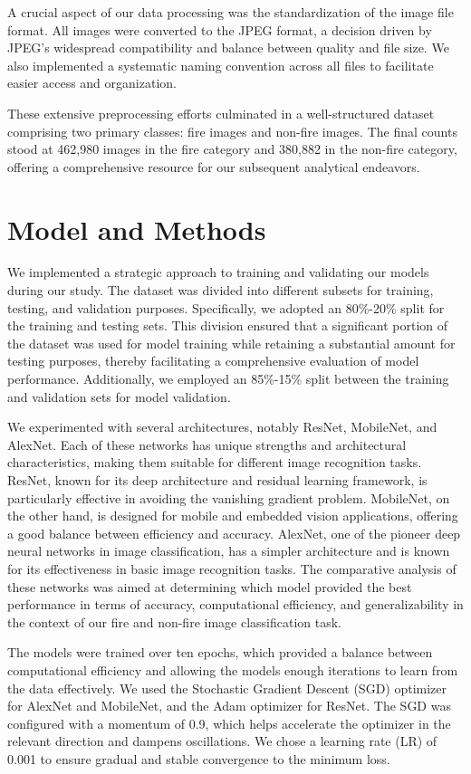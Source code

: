 A crucial aspect of our data processing was the standardization of the image file format. All images were converted to the JPEG format, a decision driven by JPEG's widespread compatibility and balance between quality and file size. We also implemented a systematic naming convention across all files to facilitate easier access and organization.

These extensive preprocessing efforts culminated in a well-structured dataset comprising two primary classes: fire images and non-fire images. The final counts stood at 462,980 images in the fire category and 380,882 in the non-fire category, offering a comprehensive resource for our subsequent analytical endeavors.

\section{Model and Methods}

We implemented a strategic approach to training and validating our models during our study. The dataset was divided into different subsets for training, testing, and validation purposes. Specifically, we adopted an 80\%-20\% split for the training and testing sets. This division ensured that a significant portion of the dataset was used for model training while retaining a substantial amount for testing purposes, thereby facilitating a comprehensive evaluation of model performance. Additionally, we employed an 85\%-15\% split between the training and validation sets for model validation.

We experimented with several architectures, notably ResNet, MobileNet, and AlexNet. Each of these networks has unique strengths and architectural characteristics, making them suitable for different image recognition tasks. ResNet, known for its deep architecture and residual learning framework, is particularly effective in avoiding the vanishing gradient problem. MobileNet, on the other hand, is designed for mobile and embedded vision applications, offering a good balance between efficiency and accuracy. AlexNet, one of the pioneer deep neural networks in image classification, has a simpler architecture and is known for its effectiveness in basic image recognition tasks. The comparative analysis of these networks was aimed at determining which model provided the best performance in terms of accuracy, computational efficiency, and generalizability in the context of our fire and non-fire image classification task.

The models were trained over ten epochs, which provided a balance between computational efficiency and allowing the models enough iterations to learn from the data effectively. We used the Stochastic Gradient Descent (SGD) optimizer for AlexNet and MobileNet, and the Adam optimizer for ResNet. The SGD was configured with a momentum of 0.9, which helps accelerate the optimizer in the relevant direction and dampens oscillations. We chose a learning rate (LR) of 0.001 to ensure gradual and stable convergence to the minimum loss.

